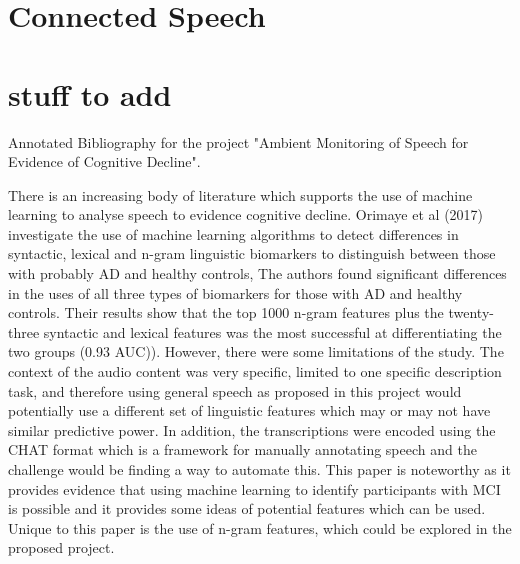 \documentclass[a4paper]{article}
\begin{document}
\section{Connected Speech}

\section{stuff to add}
Annotated Bibliography for the project "Ambient Monitoring of Speech for Evidence of Cognitive Decline".
\newline
\par 
There is an increasing body of literature which supports the use of machine learning to analyse speech to evidence cognitive decline. Orimaye et al (2017) investigate the use of machine learning algorithms to detect differences in syntactic, lexical and n-gram linguistic biomarkers to distinguish between those with probably AD and healthy controls, The authors found significant differences in the uses of all three types of biomarkers for those with AD and healthy controls. Their results show that the top 1000 n-gram features plus the twenty-three syntactic and lexical features was the most successful at differentiating the two groups (0.93 AUC)). However, there were some limitations of the study. The context of the audio content was very specific, limited to one specific description task, and therefore using general speech as proposed in this project would potentially use a different set of linguistic features which may or may not have similar predictive power. In addition, the transcriptions were encoded using the CHAT format which is a framework for manually annotating speech and the challenge would be finding a way to automate this. This paper is noteworthy as it provides evidence that using machine learning to identify participants with MCI is possible and it provides some ideas of potential features which can be used. Unique to this paper is the use of n-gram features, which could be explored in the proposed project.
\newline
\par
\end{document}
